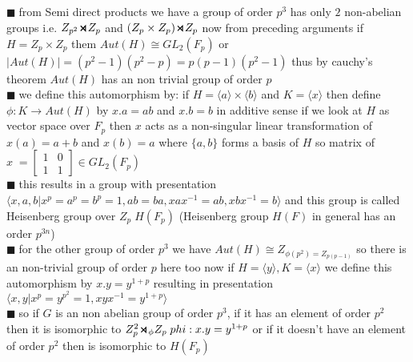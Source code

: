 \documentclass[11pt]{extarticle}
\newcommand{\ra}{\rightarrow}
\newcommand{\snote}[1]{{\footnotesize(#1)}}
\newcommand{\y}{$\blacksquare\;$}
\newcommand{\smdp}{ \,
\begin{tikzpicture}
	\draw[thick] (0,0)--(1ex,1ex)--(1ex,0)--(0,1ex);
\end{tikzpicture} 
\,
}
\newcommand{\gen}[1]{\langle #1 \rangle}
\newcommand{\tbx}[2][]{
	\begin{tcolorbox}[enhanced,breakable,size=small,colback=black!2!white,title={#1},arc is angular, arc=1.5mm,drop fuzzy shadow]
		#2
	\end{tcolorbox}
}
\newcommand{\tm}{\times}
\begin{document}
\begin{multicols}{2}
	\tbx[Semi direct relation and presentation of groups of order $ p^3 $  ]{ \y from Semi direct products we have a group of order $ p^3 $ has only $ 2 $ non-abelian groups i.e. $ Z_{p^2}\smdp Z_p$ and $ (Z_p\tm Z_p) \smdp Z_p$ now from preceding arguments if $ H=Z_p\tm Z_p $ them $ Aut(H)\cong GL_2(F_p) $ or $ |Aut(H)|=(p^2-1)(p^2-p)=p(p-1)(p^2-1) $ thus by cauchy's theorem $ Aut(H) $ has an non trivial group of order $ p $ \\
	\y we define this automorphism by: if $H=\gen{a}\tm \gen{b}  $ and $ K=\gen{x} $ then define $ \phi: K\ra Aut(H) $ by  $ x.a=ab $ and $ x.b=b $ in additive sense if we look at $ H $ as vector space over $ F_p $ then $ x $ acts as a non-singular linear transformation of $ x(a)=a+b $ and $ x(b)=a $ where $ \{a,b\} $ forms a basis of $ H $ so matrix of $ x \; =\begin{bmatrix}
		1&0\\
		1&1
	\end{bmatrix} \in GL_2(F_p)$  \\
\y this results in a group with presentation 
$\gen{x,a,b|x^p=a^p=b^p=1,ab=ba,xax^{-1}=ab, xbx^{-1}=b}$ and this group is called Heisenberg group  over $ Z_p \; H(F_p)$ \snote{Heisenberg group $ H(F) $ in general has an order $ p^{3n} $}\\
\y for the other group of order $ p^3 $ we have $ Aut(H)\cong Z_{\phi(p^2)=Z_{p(p-1)}} $ so there is an non-trivial group of order $ p $ here too now if $ H= \gen{y}, K=\gen{x}$ we define this automorphism by $ x.y=y^{1+p} $ resulting in presentation $ \gen{x,y|x^p=y^{p^2}=1, xyx^{-1}=y^{1+p}} $ \\
\y so if $ G $ is an non abelian group of order $ p^3 $, if it has an element of order $ p^2 $ then it is isomorphic to $ Z_p^2\smdp_\phi Z_p \; phi:x.y=y^{1+p}$ or if it doesn't have an element of order $ p^2 $ then is isomorphic to $ H(F_p) $ }

\end{multicols}
\end{document}
